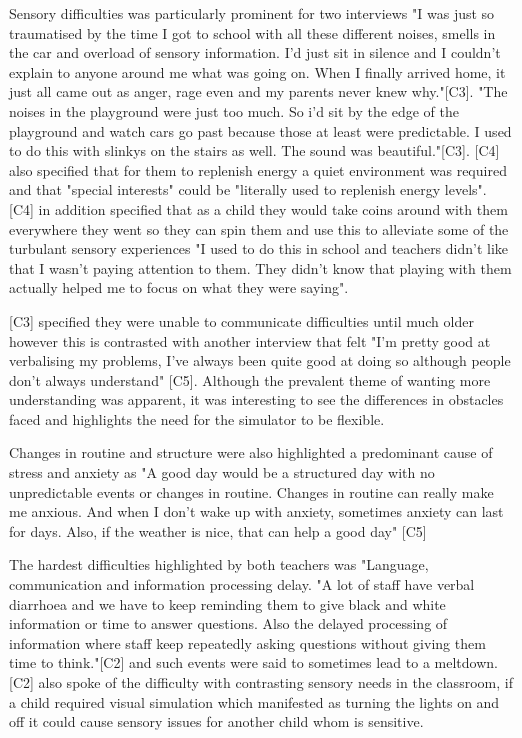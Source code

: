\documentclass[11pt]{report}
\begin{document}
Sensory difficulties was particularly prominent for two interviews "I was just so traumatised by the time I got to school with all these different noises, smells in the car and overload of sensory information. I'd just sit in silence and I couldn’t explain to anyone around me what was going on. When I finally arrived home, it just all came out as anger, rage even and my parents never knew why."[C3]. "The noises in the playground were just too much. So i'd sit by the edge of the playground and watch cars go past because those at least were predictable. I used to do this with slinkys on the stairs as well. The sound was beautiful."[C3]. [C4] also specified that for them to replenish energy a quiet environment was required and that "special interests" could be "literally used to replenish energy levels". [C4] in addition specified that as a child they would take coins around with them everywhere they went so they can spin them and use this to alleviate some of the turbulant sensory experiences "I used to do this in school and teachers didn't like that I wasn't paying attention to them. They didn't know that playing with them actually helped me to focus on what they were saying".

[C3] specified they were unable to communicate difficulties until much older however this is contrasted with another interview that felt "I'm pretty good at verbalising my problems, I've always been quite good at doing so although people don't always understand" [C5]. Although the prevalent theme of wanting more understanding was apparent, it was interesting to see the differences in obstacles faced and highlights the need for the simulator to be flexible. 

Changes in routine and structure were also highlighted a predominant cause of stress and anxiety as "A good day would be a structured day with no unpredictable events or changes in routine. Changes in routine can really make me anxious. And when I don't wake up with anxiety, sometimes anxiety can last for days. Also, if the weather is nice, that can help a good day" [C5]

The hardest difficulties highlighted by both teachers was "Language, communication and information processing delay. "A lot of staff have verbal diarrhoea and we have to keep reminding them to give black and white information or time to answer questions. Also the delayed processing of information where staff keep repeatedly asking questions without giving them time to think."[C2] and such events were said to sometimes lead to a meltdown. [C2] also spoke of the difficulty with contrasting sensory needs in the classroom, if a child required visual simulation which manifested as turning the lights on and off it could cause sensory issues for another child whom is sensitive. 
\end{document}
